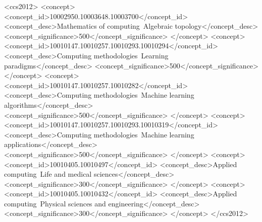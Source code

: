 \documentclass[manuscript,screen]{acmart}
\begin{document}
\begin{CCSXML}
<ccs2012>
   <concept>
       <concept_id>10002950.10003648.10003700</concept_id>
       <concept_desc>Mathematics of computing~Algebraic topology</concept_desc>
       <concept_significance>500</concept_significance>
       </concept>
   <concept>
       <concept_id>10010147.10010257.10010293.10010294</concept_id>
       <concept_desc>Computing methodologies~Learning paradigms</concept_desc>
       <concept_significance>500</concept_significance>
       </concept>
   <concept>
       <concept_id>10010147.10010257.10010282</concept_id>
       <concept_desc>Computing methodologies~Machine learning algorithms</concept_desc>
       <concept_significance>500</concept_significance>
       </concept>
   <concept>
       <concept_id>10010147.10010257.10010293.10010319</concept_id>
       <concept_desc>Computing methodologies~Machine learning applications</concept_desc>
       <concept_significance>500</concept_significance>
       </concept>
   <concept>
       <concept_id>10010405.10010497</concept_id>
       <concept_desc>Applied computing~Life and medical sciences</concept_desc>
       <concept_significance>300</concept_significance>
       </concept>
   <concept>
       <concept_id>10010405.10010432</concept_id>
       <concept_desc>Applied computing~Physical sciences and engineering</concept_desc>
       <concept_significance>300</concept_significance>
       </concept>
 </ccs2012>
\end{CCSXML}






 


 
\maketitle

\tableofcontents
\end{document}

